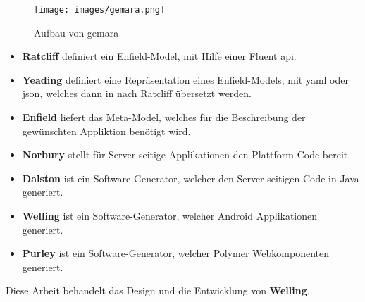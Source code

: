 \begin{figure}[H]
	\begin{center}
		\texttt{[image: images/gemara.png]}
		\caption{Aufbau von \acs{gemara}}
		\label{fig:gemara}
	\end{center}
\end{figure}

\begin{itemize}
	\item \textbf{Ratcliff} definiert ein Enfield-Model, mit Hilfe einer Fluent \acs{api}.
	\item \textbf{Yeading} definiert eine Repräsentation eines Enfield-Models, mit \acf{yaml} oder \acf{json}, welches dann in nach Ratcliff übersetzt werden.
	\item \textbf{Enfield} liefert das Meta-Model, welches für die Beschreibung der gewünschten Appliktion benötigt wird.
	\item \textbf{Norbury} stellt für Server-seitige Applikationen den Plattform Code bereit.
	\item \textbf{Dalston} ist ein Software-Generator, welcher den Server-seitigen Code in Java generiert.
	\item \textbf{Welling} ist ein Software-Generator, welcher Android Applikationen generiert.
	\item \textbf{Purley} ist ein Software-Generator, welcher Polymer Webkomponenten generiert. 
\end{itemize}

Diese Arbeit behandelt das Design und die Entwicklung von \textbf{Welling}.